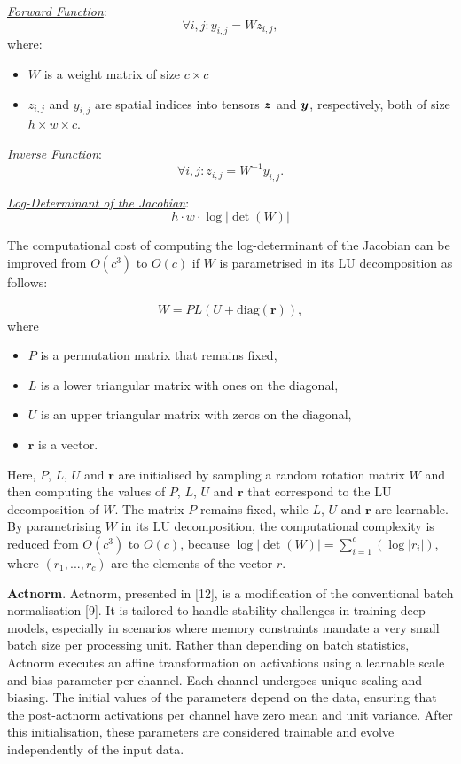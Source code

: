 \smallskip

\textit{\underline{Forward Function}}:
\[
\forall i,j : y_{i,j} = Wz_{i,j},
\]
where:
\begin{itemize}
    \item \(W\) is a weight matrix of size $c \times c$ %
    \item \(z_{i,j}\) and \(y_{i,j}\) are spatial indices into tensors \(\boldsymbol{z}\) and \(\boldsymbol{y}\), respectively, both of size  $h \times w \times c$.   
\end{itemize}

\textit{\underline{Inverse Function}}:
\[
\forall i,j : z_{i,j} = W^{-1}y_{i,j}.
\]

\textit{\underline{Log-Determinant of the Jacobian}}:
\[h \cdot w \cdot \log | \det(W)|\]

The computational cost of computing the log-determinant of the Jacobian can be improved from \( O(c^3) \) to \( O(c) \) if $W$ is parametrised in its LU decomposition as follows:

\[ W = PL(U + \text{diag}(\textbf{r})), \] 
where
\begin{itemize} \item \( P \) is a permutation matrix that remains fixed, \item \( L \) is a lower triangular matrix with ones on the diagonal, \item \( U \) is an upper triangular matrix with zeros on the diagonal, \item \( \textbf{r} \) is a vector. \end{itemize}

Here, $P$, $L$, $U$ and \( \textbf{r} \) are initialised by sampling a random rotation matrix $W$ and then computing the values of $P$, $L$, $U$ and \( \textbf{r} \) that correspond to the LU decomposition of $W$. The matrix $P$ remains fixed, while $L$, $U$ and \( \textbf{r} \) are learnable. By parametrising $W$ in its LU decomposition, the computational complexity is reduced from \( O(c^3) \) to \( O(c) \), because $\log | \det(W)| = \sum_{i=1}^{c}(\log |r_i|)$, where $(r_1,...,r_c)$ are the elements of the vector $r$.

\smallskip

\textbf{Actnorm}. Actnorm, presented in [12], is a modification of the conventional batch normalisation [9]. It is tailored to handle stability challenges in training deep models, especially in scenarios where memory constraints mandate a very small batch size per processing unit. Rather than depending on batch statistics, Actnorm executes an affine transformation on activations using a learnable scale and bias parameter per channel. Each channel undergoes unique scaling and biasing. The initial values of the parameters depend on the data, ensuring that the post-actnorm activations per channel have zero mean and unit variance. After this initialisation, these parameters are considered trainable and evolve independently of the input data.

